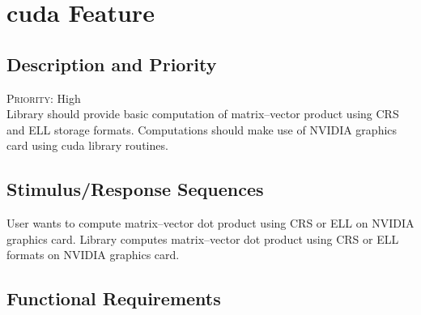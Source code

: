 \section{\gls{cuda} Feature} \label{s:system-features:cuda-feature}
	\begin{comment}
		$<$Don’t really say “System Feature 1.” State the feature name in just a few 
		words.$>$
	\end{comment}
	
\subsection*{Description and Priority}
	\begin{comment}
		$<$Provide a short description of the feature and indicate whether it is of 
		High, Medium, or Low priority. You could also include specific priority 
		component ratings, such as benefit, penalty, cost, and risk (each rated on a 
		relative scale from a low of 1 to a high of 9).$>$
	\end{comment}
	\textsc{Priority:} High \\
	Library should provide basic computation of matrix--vector product using \glsdesc{CRS} and \glsdesc{ELL} storage formats. Computations should make use of NVIDIA graphics card using \gls{cuda} library routines.
\subsection*{Stimulus/Response Sequences}
	\begin{comment}
		$<$List the sequences of user actions and system responses that stimulate the 
		behavior defined for this feature. These will correspond to the dialog elements 
		associated with use cases.$>$
	\end{comment}
	
	\stimresp
	{User wants to compute matrix--vector dot product using \gls{CRS} or \gls{ELL} on NVIDIA graphics card.}
	{Library computes matrix--vector dot product using \gls{CRS} or \gls{ELL} formats on NVIDIA graphics card.}
\subsection*{Functional Requirements}
	\begin{comment}
		$<$Itemize the detailed functional requirements associated with this feature.  
		These are the software capabilities that must be present in order for the user 
		to carry out the services provided by the feature, or to execute the use case.  
		Include how the product should respond to anticipated error conditions or 
		invalid inputs. Requirements should be concise, complete, unambiguous, 
		verifiable, and necessary. Use “TBD” as a placeholder to indicate when necessary 
		information is not yet available.$>$
		
		$<$Each requirement should be uniquely identified with a sequence number or a 
		meaningful tag of some kind.$>$
		
		REQ-1:	REQ-2:
	\end{comment}
	
